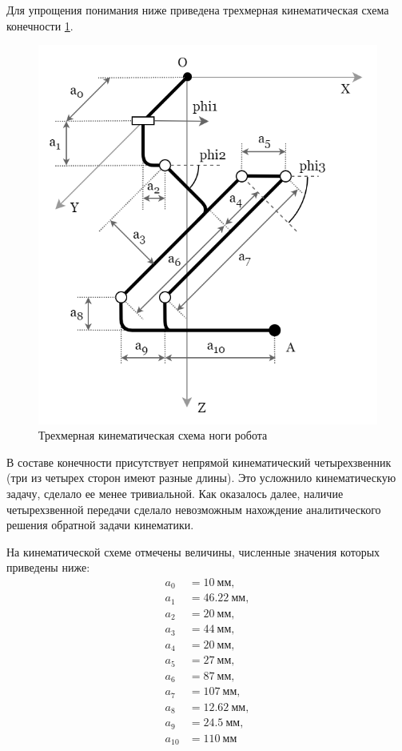 Для упрощения понимания ниже приведена трехмерная кинематическая схема конечности \ref{fig:kin_scheme}.
\begin{figure}[h] %
    \centering
    \includegraphics[scale=0.5]{chapter_kinematics/figure1.png}
    \caption{Трехмерная кинематическая схема ноги робота}
    \label{fig:kin_scheme}
\end{figure}

В составе конечности присутствует непрямой кинематический четырехзвенник (три из четырех сторон имеют разные длины). Это усложнило кинематическую задачу, сделало ее менее тривиальной. Как оказалось далее, наличие четырехзвенной передачи сделало невозможным нахождение аналитического решения обратной задачи кинематики. 

На кинематической схеме отмечены величины, численные значения которых приведены ниже:
\begin{align*} %
    a_0&=10 \: мм, \\
    a_1&=46.22 \: мм, \\
    a_2&=20 \: мм, \\
    a_3&=44 \: мм, \\
    a_4&=20 \: мм, \\
    a_5&=27 \: мм, \\
    a_6&=87 \: мм, \\
    a_7&=107 \: мм, \\
    a_8&=12.62 \: мм, \\
    a_9&=24.5 \:  мм, \\
    a_{10}&=110  \: мм
\end{align*}

